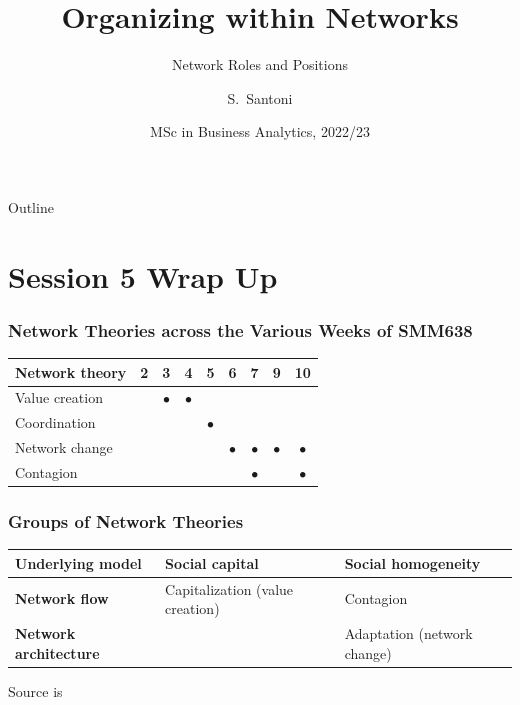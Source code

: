 \documentclass[notes, aspectratio=1610]{beamer}
\title[Organizing within Networks]
{Organizing within Networks}
\subtitle{Network Roles and Positions}
\author{S.~Santoni\inst{1}\inst{2}}
\institute{
	\inst{1}%
	Bayes Business School
	\and
	\inst{2}%
	Soundcloud
	}
\date{MSc in Business Analytics, 2022/23}
\begin{document}
\begin{frame}
	\titlepage
\end{frame}

\begin{frame}{Outline}
	\tableofcontents
\end{frame}

\section{Session 5 Wrap Up}

\begin{frame}
	\frametitle{Network Theories across the Various Weeks of SMM638}
	\begin{table}
		\begin{tabular}[c]{l|c|c|c|c|c|c|c|c}
			\textbf{Network theory} & 
			\textbf{2} & 
			\textbf{3} & 
			\textbf{4} & 
			\textbf{5} & 
			\textbf{6} & 
			\textbf{7} & 
			\textbf{9} & 
			\textbf{10}\\
			\hline
			Value creation &  & $\bullet$ & $\bullet$ &  &  &  &  & \\	
			Coordination &  &  &  & $\bullet$ &  &  &  & \\	
			Network change &  &  &  &  & $\bullet$ & $\bullet$ & $\bullet$ & $\bullet$\\	
			Contagion &  &  &  &  &  & $\bullet$ &  & $\bullet$ \\	
		\end{tabular}
	\end{table}
\end{frame}

\begin{frame}
	\frametitle{Groups of Network Theories}
	\centering
	\small
	\begin{table}
		\begin{center}
			\begin{tabular}[c]{l|l|l}
				\textbf{Underlying model} & 
				\textbf{Social capital} &
				\textbf{Social homogeneity}\\
				\hline
				\textbf{Network flow} &
				Capitalization (value creation) & 
				Contagion  \\
				\hline
				\textbf{Network architecture} & 
				\cellcolor{blue!20}{\color{black}{Coordination}} & 
				Adaptation  (network change)\\
			\end{tabular}
		\end{center}
	\end{table}

	\vspace{1em}

	\raggedright \small Source is~\cite[][page 47]{scott2011}
\end{frame}
\end{document}
